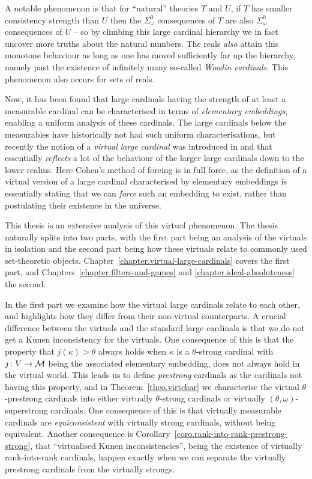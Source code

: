 \documentclass[../main]{subfiles}
\begin{document}
\begin{onehalfspacing}
\quad A notable phenomenon is that for ``natural'' theories $T$ and $U$, if $T$ has smaller consistency strength than $U$ then the $\Sigma^0_\omega$ consequences of $T$ are also $\Sigma^0_\omega$ consequences of $U$ -- so by climbing this large cardinal hierarchy we in fact uncover more truths about the natural numbers. The reals \textit{also} attain this monotone behaviour as long as one has moved sufficiently far up the hierarchy, namely past the existence of infinitely many so-called \textit{Woodin cardinals}. This phenomenon also occurs for sets of reals.

\quad Now, it has been found that large cardinals having the strength of at least a measurable cardinal can be characterised in terms of \textit{elementary embeddings}, enabling a uniform analysis of these cardinals. The large cardinals below the measurables have historically not had such uniform characterisations, but recently the notion of a \textit{virtual large cardinal} was introduced in \cite{Schindler} and \cite{GitmanSchindler} that essentially \textit{reflects} a lot of the behaviour of the larger large cardinals down to the lower realms. Here Cohen's method of forcing is in full force, as the definition of a virtual version of a large cardinal characterised by elementary embeddings is essentially stating that we can \textit{force} such an embedding to exist, rather than postulating their existence in the universe.

\quad This thesis is an extensive analysis of this virtual phenomenon. The thesis naturally splits into two parts, with the first part being an analysis of the virtuals in isolation and the second part being how these virtuals relate to commonly used set-theoretic objects. Chapter~\ref{chapter.virtual-large-cardinals} covers the first part, and Chapters~\ref{chapter.filters-and-games} and \ref{chapter.ideal-absoluteness} the second. 

\quad In the first part we examine how the virtual large cardinals relate to each other, and highlights how they differ from their non-virtual counterparts. A crucial difference between the virtuals and the standard large cardinals is that we do not get a Kunen inconsistency for the virtuals. One consequence of this is that the property that $j(\kappa)>\theta$ always holds when $\kappa$ is a $\theta$-strong cardinal with $j\colon V\to\operatorname{\mathcal M}$ being the associated elementary embedding, does not always hold in the virtual world. This leads us to define \textit{prestrong} cardinals as the cardinals not having this property, and in Theorem~\ref{theo.virtchar} we characterise the virtual $\theta$-prestrong cardinals into either virtually $\theta$-strong cardinals or virtually $(\theta,\omega)$-superstrong cardinals. One consequence of this is that virtually measurable cardinals are \textit{equiconsistent} with virtually strong cardinals, without being equivalent. Another consequence is Corollary~\ref{coro.rank-into-rank-prestrong-strong}, that ``virtualised Kunen inconsistencies'', being the existence of virtually rank-into-rank cardinals, happen exactly when we can separate the virtually prestrong cardinals from the virtually strongs.


\end{onehalfspacing}
\end{document}
